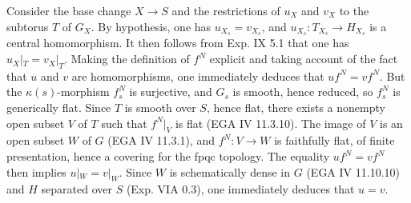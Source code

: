 Consider the base change $X\to S$ and the restrictions of $u_X$ and $v_X$ to the subtorus $T$ of $G_X$. By hypothesis, one has $u_{X_s}=v_{X_s}$, and $u_{X_s}:T_{X_s}\to H_{X_s}$ is a central homomorphism. It then follows from Exp. IX 5.1 that one has $u_X|_T=v_X|_T$. Making the definition of $f^N$ explicit and taking account of the fact that $u$ and $v$ are homomorphisms, one immediately deduces that $uf^N=vf^N$. But the $\kappa(s)$-morphism $f_s^N$ is surjective, and $G_s$ is smooth, hence reduced, so $f_s^N$ is generically flat. Since $T$ is smooth over $S$, hence flat, there exists a nonempty open subset $V$ of $T$ such that $f^N|_V$ is flat (EGA IV 11.3.10). The image of $V$ is an open subset $W$ of $G$ (EGA IV 11.3.1), and $f^N:V\to W$ is faithfully flat, of finite presentation, hence a covering for the fpqc topology. The equality $uf^N=vf^N$ then implies $u|_W=v|_W$. Since $W$ is schematically dense in $G$ (EGA IV 11.10.10) and $H$ separated over $S$ (Exp. VIA 0.3), one immediately deduces that $u=v$.
